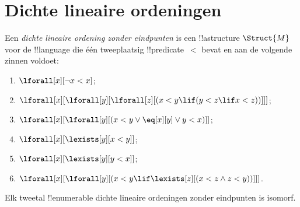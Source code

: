 \documentclass[openany]{memoir}
\begin{document}
\begingroup
\def\olfilename{OLP-0190}
\def\olfilepath{content/model-theory/basics/}
\hypertarget{unit-OLP-0190}{}



\section{Dichte lineaire ordeningen}

\begin{defn}
  Een \emph{dichte lineaire ordening zonder eindpunten} is een !!a{structure}
  $\Struct{M}$ voor de !!{language} die één tweeplaatsig
  !!{predicate}~$<$ bevat en aan de volgende zinnen voldoet:
  \begin{enumerate}
  \item $\lforall[x][\lnot x < x]$;
  \item $\lforall[x][\lforall[y][\lforall[z][(x < y \lif (y < z \lif x
    <z ))]]]$;
  \item $\lforall[x][\lforall[y][(x< y \lor \eq[x][y] \lor y < x)]]$;
  \item $\lforall[x][\lexists[y][x < y]]$;
  \item $\lforall[x][\lexists[y][y < x]]$;
  \item $\lforall[x][\lforall[y][(x < y \lif \lexists[z][(x < z \land
        z < y))]]]$.
 \end{enumerate}
\end{defn}

\begin{thm}
  Elk tweetal !!{enumerable} dichte lineaire ordeningen zonder
  eindpunten is isomorf.
\end{thm}
\end{document}
